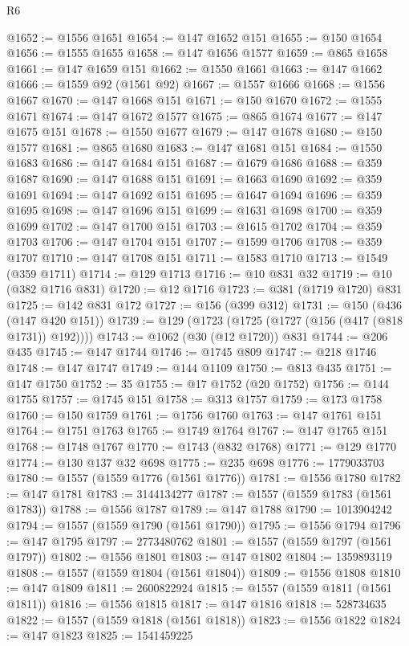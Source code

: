 \begin{lexlean}{R6}
\begin{coremodule}
@1652 := @1556 @1651
@1654 := @147 @1652 @151
@1655 := @150 @1654
@1656 := @1555 @1655
@1658 := @147 @1656 @1577
@1659 := @865 @1658
@1661 := @147 @1659 @151
@1662 := @1550 @1661
@1663 := @147 @1662
@1666 := @1559 @92 (@1561 @92)
@1667 := @1557 @1666
@1668 := @1556 @1667
@1670 := @147 @1668 @151
@1671 := @150 @1670
@1672 := @1555 @1671
@1674 := @147 @1672 @1577
@1675 := @865 @1674
@1677 := @147 @1675 @151
@1678 := @1550 @1677
@1679 := @147 @1678
@1680 := @150 @1577
@1681 := @865 @1680
@1683 := @147 @1681 @151
@1684 := @1550 @1683
@1686 := @147 @1684 @151
@1687 := @1679 @1686
@1688 := @359 @1687
@1690 := @147 @1688 @151
@1691 := @1663 @1690
@1692 := @359 @1691
@1694 := @147 @1692 @151
@1695 := @1647 @1694
@1696 := @359 @1695
@1698 := @147 @1696 @151
@1699 := @1631 @1698
@1700 := @359 @1699
@1702 := @147 @1700 @151
@1703 := @1615 @1702
@1704 := @359 @1703
@1706 := @147 @1704 @151
@1707 := @1599 @1706
@1708 := @359 @1707
@1710 := @147 @1708 @151
@1711 := @1583 @1710
@1713 := @1549 (@359 @1711)
@1714 := @129 @1713
@1716 := @10 @831 @32
@1719 := @10 (@382 @1716 @831)
@1720 := @12 @1716
@1723 := @381 (@1719 @1720) @831
@1725 := @142 @831 @172
@1727 := @156 (@399 @312)
@1731 := @150 (@436 (@147 @420 @151))
@1739 := @129 (@1723 (@1725 (@1727 (@156 (@417 (@818 @1731)) @192))))
@1743 := @1062 (@30 (@12 @1720)) @831
@1744 := @206 @435
@1745 := @147 @1744
@1746 := @1745 @809
@1747 := @218 @1746
@1748 := @147 @1747
@1749 := @144 @1109
@1750 := @813 @435
@1751 := @147 @1750
@1752 := 35
@1755 := @17 @1752 (@20 @1752)
@1756 := @144 @1755
@1757 := @1745 @151
@1758 := @313 @1757
@1759 := @173 @1758
@1760 := @150 @1759
@1761 := @1756 @1760
@1763 := @147 @1761 @151
@1764 := @1751 @1763
@1765 := @1749 @1764
@1767 := @147 @1765 @151
@1768 := @1748 @1767
@1770 := @1743 (@832 @1768)
@1771 := @129 @1770
@1774 := @130 @137 @32 @698
@1775 := @235 @698
@1776 := 1779033703
@1780 := @1557 (@1559 @1776 (@1561 @1776))
@1781 := @1556 @1780
@1782 := @147 @1781
@1783 := 3144134277
@1787 := @1557 (@1559 @1783 (@1561 @1783))
@1788 := @1556 @1787
@1789 := @147 @1788
@1790 := 1013904242
@1794 := @1557 (@1559 @1790 (@1561 @1790))
@1795 := @1556 @1794
@1796 := @147 @1795
@1797 := 2773480762
@1801 := @1557 (@1559 @1797 (@1561 @1797))
@1802 := @1556 @1801
@1803 := @147 @1802
@1804 := 1359893119
@1808 := @1557 (@1559 @1804 (@1561 @1804))
@1809 := @1556 @1808
@1810 := @147 @1809
@1811 := 2600822924
@1815 := @1557 (@1559 @1811 (@1561 @1811))
@1816 := @1556 @1815
@1817 := @147 @1816
@1818 := 528734635
@1822 := @1557 (@1559 @1818 (@1561 @1818))
@1823 := @1556 @1822
@1824 := @147 @1823
@1825 := 1541459225

\end{coremodule}
\end{lexlean}
